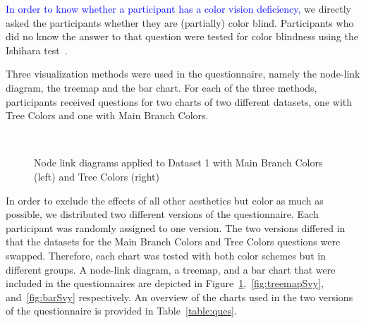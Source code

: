 \documentclass[journal]{vgtc}                %
\newcommand{\changedM}[1]{\textcolor{blue}{#1}}
\begin{document}
\changedM{In order to know whether 
a participant has a color vision deficiency,} we directly asked the participants 
whether they are (partially) color blind. Participants who did no know the answer
to that question were tested for 
color blindness using the Ishihara test~\cite{ishihara}. 

Three visualization methods were used in the questionnaire, namely the node-link diagram, the treemap and the bar chart. For each of the three methods, participants received questions for two charts of two different datasets, one with Tree Colors and one with Main Branch Colors. 

\begin{figure}[tb]
  \centering
  \mbox{
  }
  \caption{Node link diagrams applied to Dataset 1 with Main Branch Colors (left) and Tree Colors (right)}\label{fig:graphSvy}

\end{figure}

In order to exclude the effects of all other aesthetics but color as much as possible, we distributed two different versions of the questionnaire. Each participant was randomly assigned to one version. The two versions differed in that the datasets for the Main Branch Colors and Tree Colors questions were swapped. Therefore, each chart was tested with both color schemes but in different groups. A node-link diagram, a treemap, and a bar chart that were included in the questionnaires are depicted in Figure~\ref{fig:graphSvy},~\ref{fig:treemapSvy}, and~\ref{fig:barSvy} respectively. An overview of the charts used in the two versions of the questionnaire is provided in Table~\ref{table:ques}.
\end{document}
